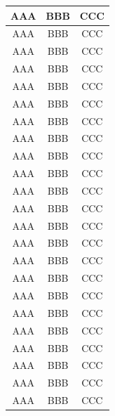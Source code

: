\documentclass{article}
\begin{document}
	\kant[1-2]
	\lipsum[1-2]
	\begin{table}[H]
		\centering
		\begin{tabular}{c|c|c}
			AAA & BBB & CCC \\
			\hline AAA & BBB & CCC \\
			\hline AAA & BBB & CCC \\
			\hline AAA & BBB & CCC \\
			\hline AAA & BBB & CCC \\
			\hline AAA & BBB & CCC \\
			\hline AAA & BBB & CCC \\
			\hline AAA & BBB & CCC \\
			\hline AAA & BBB & CCC \\
			\hline AAA & BBB & CCC \\
			\hline AAA & BBB & CCC \\
			\hline AAA & BBB & CCC \\
			\hline AAA & BBB & CCC \\
			\hline AAA & BBB & CCC \\
			\hline AAA & BBB & CCC \\
			\hline AAA & BBB & CCC \\
			\hline AAA & BBB & CCC \\
			\hline AAA & BBB & CCC \\
			\hline AAA & BBB & CCC \\
			\hline AAA & BBB & CCC \\
			\hline AAA & BBB & CCC \\
			\hline AAA & BBB & CCC \\
			\hline AAA & BBB & CCC \\
		\end{tabular}
	\end{table} 
	\kant[1]
\end{document}
